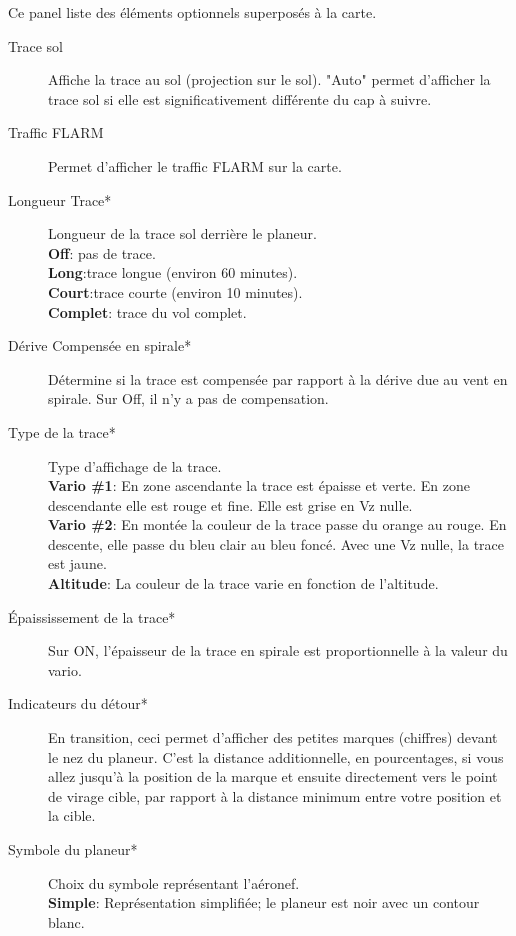 Ce panel liste des éléments optionnels superposés à la carte.

\begin{description}
\item[Trace sol]  Affiche la trace au sol (projection sur le sol). "Auto" permet d'afficher la trace sol si elle est significativement différente du cap à suivre.
\item[Traffic FLARM]  \label{conf:flarm-on-map} Permet d'afficher le traffic FLARM sur la carte.
\item[Longueur Trace*] \label{conf:snailtrail} Longueur de la trace sol derrière le planeur.\\
  {\bf Off}: pas de trace. \\
  {\bf Long}:trace longue (environ 60 minutes). \\
  {\bf Court}:trace courte (environ 10 minutes). \\
  {\bf Complet}: trace du vol complet.
\item[Dérive Compensée en spirale*] \label{conf:traildrift} Détermine si la trace est compensée par rapport à la dérive due au vent en spirale. Sur Off, il n'y a pas de compensation.
\item[Type de la trace*] \label{conf:snailtype} Type d'affichage de la trace. \\
  {\bf Vario \#1}: En zone ascendante la trace est épaisse et verte. En zone descendante elle est rouge et fine. Elle est grise en Vz nulle.\\
  {\bf Vario \#2}: En montée la couleur de la trace passe du orange au rouge. En descente, elle passe du bleu clair au bleu foncé. Avec une Vz nulle, la trace est jaune.\\
  {\bf Altitude}: La couleur de la trace varie en fonction de l'altitude.
\item[Épaississement de la trace*] \label{conf:trailscaled} Sur ON, l'épaisseur de la trace en spirale est proportionnelle à la valeur du vario.
\item[Indicateurs du détour*]  En transition, ceci permet d'afficher des petites marques (chiffres) devant le nez du planeur. C'est la distance additionnelle, en pourcentages, si vous allez jusqu'à la position de la marque et ensuite directement vers le point de virage cible, par rapport à la distance minimum entre votre position et la cible.
\item[Symbole du planeur*]  Choix du symbole représentant l'aéronef. \\
  {\bf Simple}: Représentation simplifiée; le planeur est noir avec un contour blanc.\\

\end{description}
